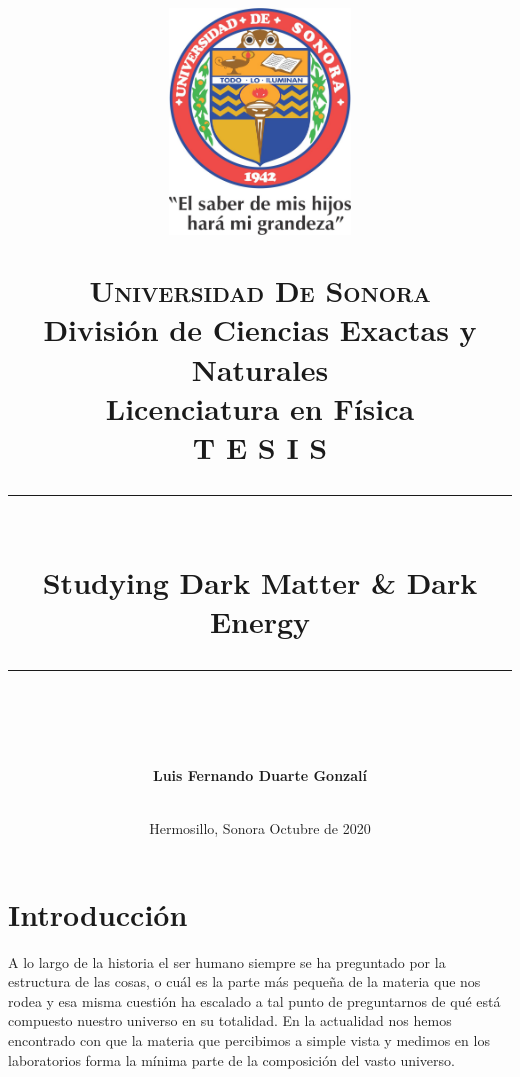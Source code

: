 \documentclass[12pt]{article}
\newcommand{\HRule}[1]{\rule{\linewidth}{#1}}
\begin{document}
\begin{titlepage}

\title{\normalsize 
        \begin{center}
        \includegraphics[height=6cm]{LogoUnison.jpg}
        \end{center}
        \LARGE \textsc{\textbf{Universidad De Sonora}} \\ \bigskip
		\Large División de Ciencias Exactas y Naturales \\
        Licenciatura en Física \\ \bigskip
        \bigskip
        T E S I S
		\\ [0.1cm]  
		\HRule{2pt} \\
		\Large \textbf{{Studying Dark Matter \& Dark Energy}} \\
		\HRule{2pt} \\
		\normalsize \vspace*{0.001\baselineskip}}
        
\date{\bigskip \Large Hermosillo, Sonora  \hspace*{\fill} Octubre de 2020}

        
\author{
		\Large\textbf{Luis Fernando Duarte Gonzalí} \\ \bigskip
        \\ \bigskip}
       \end{titlepage}
       \maketitle
       



\newpage
\tableofcontents
\newpage
\pagestyle{plain}
\section{Introducción}
\noindent A lo largo de la historia el ser humano siempre se ha preguntado por la estructura de las cosas, o cuál es la parte más pequeña de la materia que nos rodea y esa misma cuestión ha escalado a tal punto de preguntarnos de qué está compuesto nuestro universo en su totalidad. En la actualidad nos hemos encontrado con que la materia que percibimos a simple vista y medimos en los laboratorios forma la mínima parte de la composición del vasto universo.
\end{document}
